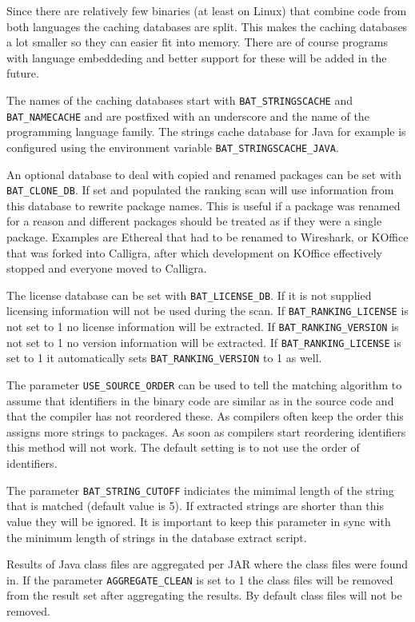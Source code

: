 \documentclass[10pt]{article}
\begin{document}
Since there are relatively few binaries (at least on Linux) that combine
code from both languages the caching databases are split. This makes the
caching databases a lot smaller so they can easier fit into memory. There are
of course programs with language embeddeding and better support for these will
be added in the future.

The names of the caching databases start with \texttt{BAT\_STRINGSCACHE} and
\texttt{BAT\_NAMECACHE} and are postfixed with an underscore and the name of
the programming language family.  The strings cache database for Java for
example is configured using the environment variable
\texttt{BAT\_STRINGSCACHE\_JAVA}.

An optional database to deal with copied and renamed packages can be set with
\texttt{BAT\_CLONE\_DB}. If set and populated the ranking scan will use
information from this database to rewrite package names. This is useful if a
package was renamed for a reason and different packages should be treated as if
they were a single package. Examples are Ethereal that had to be renamed to
Wireshark, or KOffice that was forked into Calligra, after which development
on KOffice effectively stopped and everyone moved to Calligra.

The license database can be set with \texttt{BAT\_LICENSE\_DB}. If it is not
supplied licensing information will not be used during the scan. If
\texttt{BAT\_RANKING\_LICENSE} is not set to 1 no license information will be
extracted. If \texttt{BAT\_RANKING\_VERSION} is not set to 1 no version
information will be extracted. If \texttt{BAT\_RANKING\_LICENSE} is set to 1 it
automatically sets \texttt{BAT\_RANKING\_VERSION} to 1 as well.

The parameter \texttt{USE\_SOURCE\_ORDER} can be used to tell the matching
algorithm to assume that identifiers in the binary code are similar as in the
source code and that the compiler has not reordered these. As compilers often
keep the order this assigns more strings to packages. As soon as compilers
start reordering identifiers this method will not work. The default setting
is to not use the order of identifiers.

The parameter \texttt{BAT\_STRING\_CUTOFF} indiciates the mimimal length of the
string that is matched (default value is 5). If extracted strings are shorter
than this value they will be ignored. It is important to keep this parameter in
sync with the minimum length of strings in the database extract script.

Results of Java class files are aggregated per JAR where the class files were
found in. If the parameter \texttt{AGGREGATE\_CLEAN} is set to 1 the class
files will be removed from the result set after aggregating the results. By
default class files will not be removed.
\end{document}
